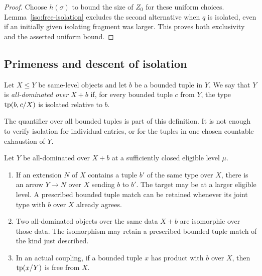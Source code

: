 \begin{proof}
Choose $h(\sigma)$ to bound the size of $Z_0$ for these uniform choices.
Lemma~\ref{iso:free-isolation} excludes the second alternative when $q$
is isolated, even if an initially given isolating fragment was larger.
This proves both exclusivity and the asserted uniform bound.
\end{proof}

\subsection{Primeness and descent of isolation}

\begin{definition}\label{iso:all-dominated-definition}
Let $X\leq Y$ be same-level objects and let $b$ be a bounded tuple in
$Y$. We say that $Y$ is \emph{all-dominated over $X+b$} if, for every
bounded tuple $c$ from $Y$, the type $\operatorname{tp}(b,c/X)$ is isolated relative
to $b$.
\end{definition}

The quantifier over all bounded tuples is part of this definition. It is
not enough to verify isolation for individual entries, or for the tuples
in one chosen countable exhaustion of $Y$.

\begin{proposition}\label{iso:prime}
Let $Y$ be all-dominated over $X+b$ at a sufficiently closed eligible
level $\mu$.
\begin{enumerate}
\item If an extension $N$ of $X$ contains a tuple $b'$ of the same type
over $X$, there is an arrow $Y\longrightarrow N$ over $X$ sending $b$
to $b'$. The target may be at a larger eligible level. A prescribed
bounded tuple match can be retained whenever its joint type with $b$
over $X$ already agrees.
\item Two all-dominated objects over the same data $X+b$ are isomorphic
over those data. The isomorphism may retain a prescribed bounded tuple
match of the kind just described.
\item In an actual coupling, if a bounded tuple $x$ has product with
$b$ over $X$, then $\operatorname{tp}(x/Y)$ is free from $X$.
\end{enumerate}
\end{proposition}


